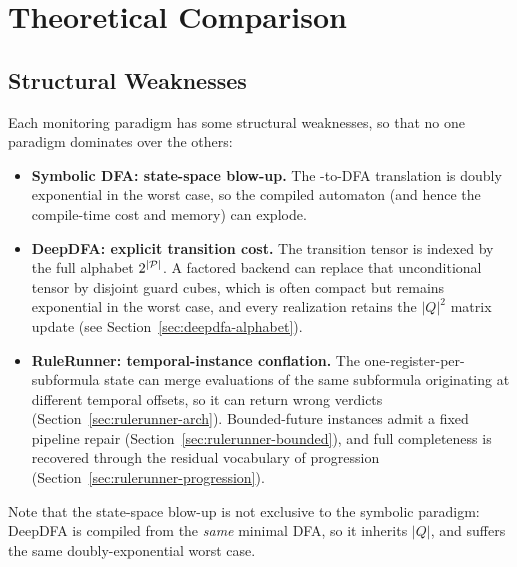 \section{Theoretical Comparison}
\label{sec:theory-cmp}


\subsection{Structural Weaknesses}
\label{sec:rulerunner-ladder}

Each monitoring paradigm has some structural weaknesses, so that no one paradigm dominates over the others:
%
\begin{itemize}
    \item \textbf{Symbolic DFA: state-space blow-up.} The \ltlf-to-DFA translation is doubly exponential in the worst case, so the compiled automaton (and hence the compile-time cost and memory) can explode.
    \item \textbf{DeepDFA: explicit transition cost.} The transition tensor is indexed by the full alphabet $2^{|{\mathcal{P}}|}$. A factored backend can replace that unconditional tensor by disjoint guard cubes, which is often compact but remains exponential in the worst case, and every realization retains the $|Q|^2$ matrix update (see Section~\ref{sec:deepdfa-alphabet}).
    \item \textbf{RuleRunner: temporal-instance conflation.} The one-register-per-subformula state can merge evaluations of the same subformula originating at different temporal offsets, so it can return wrong verdicts (Section~\ref{sec:rulerunner-arch}). Bounded-future instances admit a fixed pipeline repair (Section~\ref{sec:rulerunner-bounded}), and full \ltlf completeness is recovered through the residual vocabulary of progression (Section~\ref{sec:rulerunner-progression}).
\end{itemize}
%
Note that the state-space blow-up is not exclusive to the symbolic paradigm: DeepDFA is compiled from the \emph{same} minimal DFA, so it inherits $|Q|$, and suffers the same doubly-exponential worst case.


